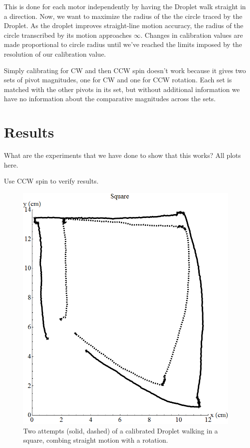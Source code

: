 \documentclass[letterpaper, 10pt, conference]{ieeeconf}
\begin{document}
This is done for each motor independently by having the Droplet walk straight in a direction. Now, we want to maximize the radius of the the circle traced by the Droplet. As the droplet improves straight-line motion accuracy, the radius of the circle transcribed by its motion approaches $\infty$. Changes in calibration values are made proportional to circle radius until we've reached the limits imposed by the resolution of our calibration value.

Simply calibrating for CW and then CCW spin doesn't work because it gives two sets of pivot magnitudes, one for CW and one for CCW rotation. Each set is matched with the other pivots in its set, but without additional information we have no information about the comparative magnitudes across the sets.




\section{Results}

What are the experiments that we have done to show that this works? All plots here.

Use CCW spin to verify results.

\begin{figure}[!htb]
\centering
\includegraphics[width=\linewidth]{Images/dropletWalksSquare}
\caption{Two attempts (solid, dashed) of a calibrated Droplet walking in a square, combing straight motion with a rotation.}
\label{fig:someting}
\end{figure}
\end{document}
